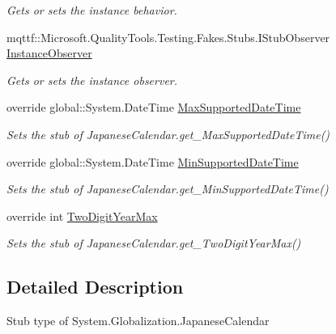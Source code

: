 \begin{DoxyCompactItemize}
\begin{DoxyCompactList}\small\item\em Gets or sets the instance behavior.\end{DoxyCompactList}\item 
mqttf\-::\-Microsoft.\-Quality\-Tools.\-Testing.\-Fakes.\-Stubs.\-I\-Stub\-Observer \hyperlink{class_system_1_1_globalization_1_1_fakes_1_1_stub_japanese_calendar_a3b927d83e0ba3f1bb11e377d7acedcac}{Instance\-Observer}
\begin{DoxyCompactList}\small\item\em Gets or sets the instance observer.\end{DoxyCompactList}\item 
override global\-::\-System.\-Date\-Time \hyperlink{class_system_1_1_globalization_1_1_fakes_1_1_stub_japanese_calendar_a4da4aa0f20a0aa3e8c90630f6fb8dca2}{Max\-Supported\-Date\-Time}
\begin{DoxyCompactList}\small\item\em Sets the stub of Japanese\-Calendar.\-get\-\_\-\-Max\-Supported\-Date\-Time()\end{DoxyCompactList}\item 
override global\-::\-System.\-Date\-Time \hyperlink{class_system_1_1_globalization_1_1_fakes_1_1_stub_japanese_calendar_aac170f4e845be42bfbecc4bae6f584e4}{Min\-Supported\-Date\-Time}
\begin{DoxyCompactList}\small\item\em Sets the stub of Japanese\-Calendar.\-get\-\_\-\-Min\-Supported\-Date\-Time()\end{DoxyCompactList}\item 
override int \hyperlink{class_system_1_1_globalization_1_1_fakes_1_1_stub_japanese_calendar_a8973763408f91c6bac7c6f448a0cb576}{Two\-Digit\-Year\-Max}
\begin{DoxyCompactList}\small\item\em Sets the stub of Japanese\-Calendar.\-get\-\_\-\-Two\-Digit\-Year\-Max()\end{DoxyCompactList}\end{DoxyCompactItemize}


\subsection{Detailed Description}
Stub type of System.\-Globalization.\-Japanese\-Calendar



